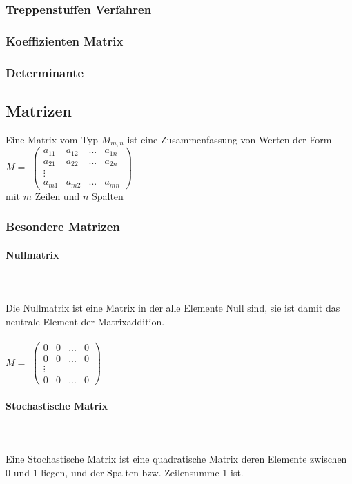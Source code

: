 \documentclass[a4paper]{article} %
\begin{document}
	\subsubsection{Treppenstuffen Verfahren}
	\subsubsection{Koeffizienten Matrix}
	\subsubsection{Determinante}
	\pagebreak
	\subsection{Matrizen}
	 \hspace{0 cm} 
	Eine Matrix vom Typ $M_{m,n}$ ist eine Zusammenfassung von Werten der Form $M =$
	$
	\begin{pmatrix}
		a_{11} & a_{12} & ... 	& a_{1n}\\
		a_{21} & a_{22} & ...		 & a_{2n}\\
	      \vdots    	&      &	    \\
		a_{m1} & a_{m2} & ...	& a_{mn}
	\end{pmatrix}
	$\\
	 mit $m$ Zeilen und $n$ Spalten
	\subsubsection{Besondere Matrizen}
		\paragraph{Nullmatrix  } 
		\hspace{0 cm} \\ \noindent \\
		Die Nullmatrix ist eine Matrix in der alle Elemente Null sind, sie ist damit das neutrale Element der Matrixaddition.\\
		\\$M =$
		$
		\begin{pmatrix}
		0 & 0 	& ... 	& 0\\
		0 & 0 	& ...	& 0\\
		\vdots  &      	&  \\
		0 & 0	& ...	& 0
		\end{pmatrix}
		$\\
	
	\paragraph{Stochastische Matrix  } 
	\hspace{0 cm} \\ \noindent \\
	Eine Stochastische Matrix ist eine quadratische Matrix deren Elemente zwischen 0 und 1 liegen, und der Spalten bzw. Zeilensumme 1 ist.
	
\end{document}
